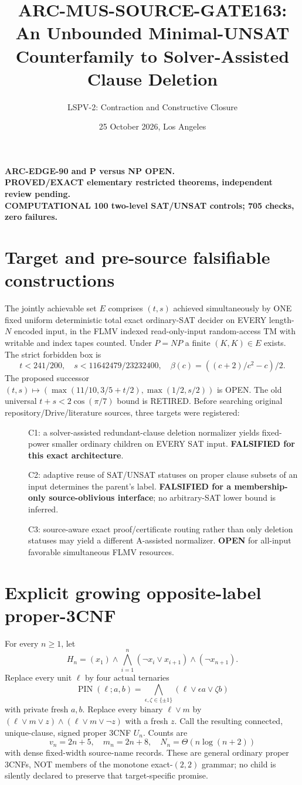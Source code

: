 \documentclass[11pt]{article}
\title{ARC-MUS-SOURCE-GATE163: An Unbounded Minimal-UNSAT Counterfamily to Solver-Assisted Clause Deletion}
\author{LSPV-2: Contraction and Constructive Closure}
\date{25 October 2026, Los Angeles}
\begin{document}
\maketitle
\begin{center}
\textbf{ARC-EDGE-90 and P versus NP OPEN.}\\
\textbf{PROVED/EXACT elementary restricted theorems, independent review pending.}\\
\textbf{COMPUTATIONAL 100 two-level SAT/UNSAT controls; 705 checks, zero failures.}
\end{center}
\section*{Target and pre-source falsifiable constructions}
The jointly achievable set $E$ comprises $(t,s)$ achieved simultaneously by ONE fixed uniform deterministic total exact ordinary-SAT decider on EVERY length-$N$ encoded input, in the FLMV indexed read-only-input random-access TM with writable and index tapes counted. Under $P=NP$ a finite $(K,K)\in E$ exists. The strict forbidden box is
\[
t<241/200,\quad s<11642479/23232400,\quad \beta(c)=((c+2)/c^2-c)/2.
\]
The proposed successor $(t,s)\mapsto(\max(11/10,3/5+t/2),\max(1/2,s/2))$ is OPEN. The old universal $t+s<2\cos(\pi/7)$ bound is RETIRED.
Before searching original repository/Drive/literature sources, three targets were registered:
\begin{description}
\item[] C1: a solver-assisted redundant-clause deletion normalizer yields fixed-power smaller ordinary children on EVERY SAT input. \textbf{FALSIFIED for this exact architecture}.
\item[] C2: adaptive reuse of SAT/UNSAT statuses on proper clause subsets of an input determines the parent's label. \textbf{FALSIFIED for a membership-only source-oblivious interface}; no arbitrary-SAT lower bound is inferred.
\item[] C3: source-aware exact proof/certificate routing rather than only deletion statuses may yield a different A-assisted normalizer. \textbf{OPEN} for all-input favorable simultaneous FLMV resources.
\end{description}

\section*{Explicit growing opposite-label proper-3CNF}
For every $n\ge1$, let
\[
H_n=(x_1)\wedge\bigwedge_{i=1}^n(\neg x_i\vee x_{i+1})\wedge(\neg x_{n+1}).
\]
Replace every unit $\ell$ by four actual ternaries
\[
\operatorname{PIN}(\ell;a,b)=\bigwedge_{\epsilon,\zeta\in\{\pm1\}}(\ell\vee\epsilon a\vee\zeta b)
\]
with private fresh $a,b$. Replace every binary $\ell\vee m$ by $(\ell\vee m\vee z)\wedge(\ell\vee m\vee\neg z)$ with a fresh $z$. Call the resulting connected, unique-clause, signed proper 3CNF $U_n$. Counts are
\[
v_n=2n+5,\quad m_n=2n+8,\quad N_n=\Theta(n\log(n+2))
\]
with dense fixed-width source-name records. These are general ordinary proper 3CNFs, NOT members of the monotone exact-$(2,2)$ grammar; no child is silently declared to preserve that target-specific promise.
\end{document}
